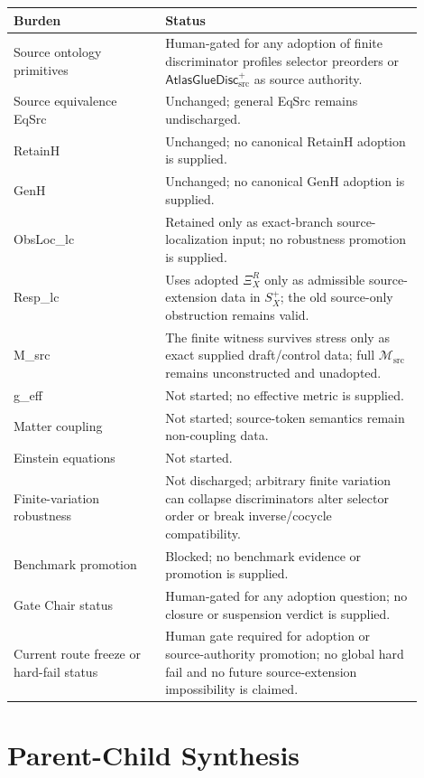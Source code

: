 \documentclass[11pt]{article}
\newcommand{\Msrc}{\mathcal{M}_{\mathrm{src}}}
\newcommand{\XiR}{\Xi_X^R}
\newcommand{\Splus}{S_X^+}
\newcommand{\AtlasGlueDisc}{\mathsf{AtlasGlueDisc}_{\mathrm{src}}^{+}}
\begin{document}
\begin{center}
\begin{tabular}{p{0.33\linewidth}p{0.57\linewidth}}
\hline
Burden & Status \\
\hline
Source ontology primitives & Human-gated for any adoption of finite discriminator profiles selector preorders or \(\AtlasGlueDisc\) as source authority. \\
Source equivalence EqSrc & Unchanged; general EqSrc remains undischarged. \\
RetainH & Unchanged; no canonical RetainH adoption is supplied. \\
GenH & Unchanged; no canonical GenH adoption is supplied. \\
ObsLoc\_lc & Retained only as exact-branch source-localization input; no robustness promotion is supplied. \\
Resp\_lc & Uses adopted \(\XiR\) only as admissible source-extension data in \(\Splus\); the old source-only obstruction remains valid. \\
M\_src & The finite witness survives stress only as exact supplied draft/control data; full \(\Msrc\) remains unconstructed and unadopted. \\
g\_eff & Not started; no effective metric is supplied. \\
Matter coupling & Not started; source-token semantics remain non-coupling data. \\
Einstein equations & Not started. \\
Finite-variation robustness & Not discharged; arbitrary finite variation can collapse discriminators alter selector order or break inverse/cocycle compatibility. \\
Benchmark promotion & Blocked; no benchmark evidence or promotion is supplied. \\
Gate Chair status & Human-gated for any adoption question; no closure or suspension verdict is supplied. \\
Current route freeze or hard-fail status & Human gate required for adoption or source-authority promotion; no global hard fail and no future source-extension impossibility is claimed. \\
\hline
\end{tabular}
\end{center}

\section{Parent-Child Synthesis}
\end{document}
